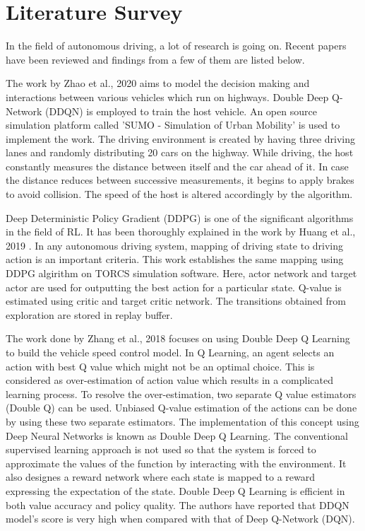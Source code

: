 \chapter{Literature Survey}
\label{ch:LR}

In the field of autonomous driving, a lot of research is going on. Recent papers have been reviewed and findings from a few of them are listed below. 


The work by Zhao et al., 2020 \cite{zhao2020deep} aims to model the decision making and interactions between various vehicles which run on highways. Double Deep Q-Network (DDQN) is employed to train the host vehicle. An open source simulation platform called 'SUMO - Simulation of Urban Mobility' is used to implement the work. The driving environment is created by having three driving lanes and randomly distributing 20 cars on the highway. While driving, the host constantly measures the distance between itself and the car ahead of it. In case the distance reduces between successive measurements, it begins to apply brakes to avoid collision. The speed of the host is altered accordingly by the algorithm. 



\par Deep Deterministic Policy Gradient (DDPG)  is one of the significant algorithms in the field of RL. It has been thoroughly explained in the work by Huang et al., 2019 \cite{huang2019end}. In any autonomous driving system, mapping of driving state to driving action is an important criteria. This work establishes the same mapping using DDPG algirithm on TORCS simulation software. Here, actor network and target actor are used for outputting the best action for a particular state. Q-value is estimated using critic and target critic network. The transitions obtained from exploration are stored in replay buffer.  

\par The work done by Zhang et al., 2018 \cite{zhang2018human} focuses on using Double Deep Q Learning to build the vehicle speed control model. In Q Learning, an agent selects an action with best Q value which might not be an optimal choice. This is considered as over-estimation of action value which results in a complicated learning process. To resolve the over-estimation, two separate Q value estimators (Double Q) can be used. Unbiased Q-value estimation of the actions can be done by using these two separate estimators. The implementation of this concept using Deep Neural Networks is known as Double Deep Q Learning. The conventional supervised learning approach is not used so that the system is forced to approximate the values of the function by interacting with the environment. It also designes a reward network where each state is mapped to a reward expressing the expectation of the state. 
Double Deep Q Learning is efficient in both value accuracy and policy quality. The authors have reported that DDQN model’s score is very high when compared with that of Deep Q-Network (DQN). 


